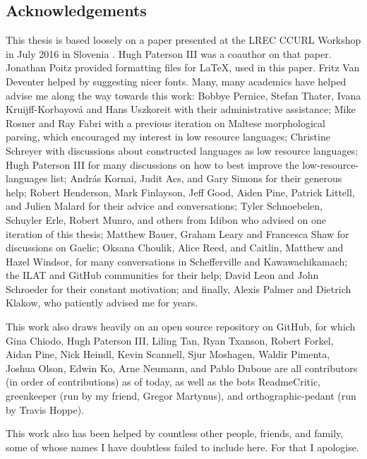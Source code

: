 \newpage
\noindent\subsection*{Acknowledgements}

This thesis is based loosely on a paper presented at the LREC CCURL Workshop in July 2016 in Slovenia \citep{CCURL}. Hugh Paterson III was a coauthor on that paper. Jonathan Poitz provided formatting files for \LaTeX, used in this paper. Fritz Van Deventer helped by suggesting nicer fonts. Many, many academics have helped advise me along the way towards this work: Bobbye Pernice, Stefan Thater, Ivana Kruijff-Korbayov\'a and Hans Uszkoreit with their administrative assistance; Mike Rosner and Ray Fabri with a previous iteration on Maltese morphological parsing, which encouraged my interest in low resource languages; Christine Schreyer with discussions about constructed languages as low resource languages; Hugh Paterson III for many discussions on how to best improve the low-resource-languages list; Andr\'{a}s Kornai, Judit Acs, and Gary Simons for their generous help; Robert Henderson, Mark Finlayson, Jeff Good, Aiden Pine, Patrick Littell, and Julien Malard for their advice and conversations; Tyler Schnoebelen, Schuyler Erle, Robert Munro, and others from Idibon who advised on one iteration of this thesis; Matthew Bauer, Graham Leary and Francesca Shaw for discussions on Gaelic; Oksana Choulik, Alice Reed, and Caitlin, Matthew and Hazel Windsor, for many conversations in Schefferville and Kawawachikamach; the ILAT and GitHub communities for their help; David Leon and John Schroeder for their constant motivation; and finally, Alexis Palmer and Dietrich Klakow, who patiently advised me for years.

This work also draws heavily on an open source repository on GitHub, for which Gina Chiodo, Hugh Paterson III, Liling Tan, Ryan Txanson, Robert Forkel, Aidan Pine, Nick Heindl, Kevin Scannell, Sjur Moshagen, Waldir Pimenta, Joshua Olson, Edwin Ko, Arne Neumann, and Pablo Duboue are all contributors (in order of contributions) as of today, as well as the bots ReadmeCritic, greenkeeper (run by my friend, Gregor Martynus), and orthographic-pedant (run by Travis Hoppe).

This work also has been helped by countless other people, friends, and family, some of whose names I have doubtless failed to include here. For that I apologise. 

